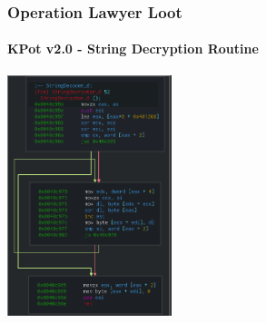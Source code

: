 \documentclass[aspectratio=169]{beamer}
\begin{document}
{
  \begin{frame}
    \frametitle{Operation Lawyer Loot}
    \framesubtitle{KPot v2.0 - String Decryption Routine}
    \begin{center}
      \includegraphics[width=4.8cm]{kpot-string-decryption}
    \end{center}
  \end{frame}
}
\end{document}
